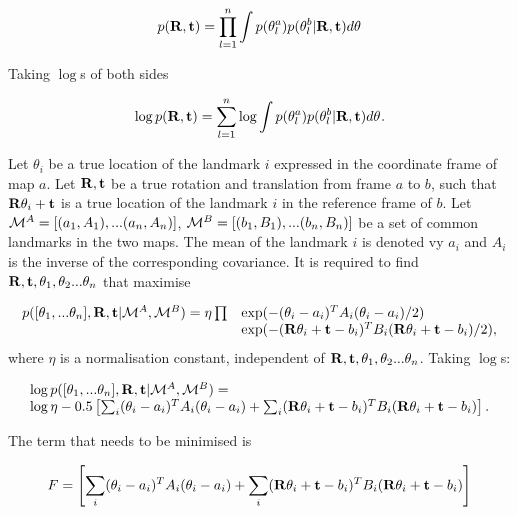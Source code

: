 \begin{equation}
p({\bf R},{\bf t}) = \prod_{l=1}^{n} \int
p(\mape{}{a}{l})p(\mape{}{b}{l}|{\bf R},{\bf t})d\mape{}{}{}
\label{eqn:align_w}
\end{equation}

Taking $\log$s of both sides

\begin{equation}
\log p({\bf R},{\bf t}) = \sum_{l=1}^{n} \log \int
p(\mape{}{a}{l})p(\mape{}{b}{l}|{\bf R},{\bf t})d\mape{}{}{}.
\label{eqn:align_log_w}
\end{equation}

Let $\theta_i$ be a true location of the landmark $i$ expressed in the
coordinate frame of map $a$. Let ${\bf R,t}$ be a true rotation and
translation from frame $a$ to $b$, such that ${\bf R}\theta_i + {\bf t}$
is a true location of the landmark $i$ in the reference frame of
$b$. Let $\mapA=[(a_1,A_1),...(a_n,A_n)]$,
$\mapB=[(b_1,B_1),...(b_n,B_n)]$ be a set of common landmarks in the two
maps. The mean of the landmark $i$ is denoted vy $a_i$ and $A_i$ is the
inverse of the corresponding covariance. It is required to find ${\bf
R,t},\theta_1, \theta_2 ...\theta_n$ that maximise

\begin{equation}
\begin{array}{ll}
p([\theta_1, ...\theta_n],{\bf R},{\bf t} | \mapA, \mapB) =
 \eta \prod& \exp(-(\theta_i - a_i)^T A_i (\theta_i - a_i)/2)\\
&\exp(-({\bf R}\theta_i + {\bf t} - b_i)^T B_i
({\bf R}\theta_i + {\bf t} - b_i)/2),
\label{eqn:align_w0}
\end{array}
\end{equation}
where $\eta$ is a normalisation constant, independent of ${\bf
R,t},\theta_1, \theta_2 ...\theta_n$. Taking $\log$s: 

\begin{equation}
\begin{array}{l}
\log p([\theta_1, ...\theta_n],{\bf R},{\bf t} | \mapA, \mapB) =\\
\log\eta - 0.5 \left[
\sum_i (\theta_i - a_i)^T A_i (\theta_i - a_i) +
\sum_i ({\bf R}\theta_i + {\bf t} - b_i)^T B_i({\bf R}\theta_i + {\bf t} - b_i)
\right].
\end{array}
\label{eqn:align_log_prob}
\end{equation}

The term that needs to be minimised is

$$
F = \left[ \sum_i (\theta_i - a_i)^T A_i (\theta_i - a_i) +
\sum_i ({\bf R}\theta_i + {\bf t} - b_i)^T B_i ({\bf R}\theta_i + {\bf t} - b_i)
\right]
$$

